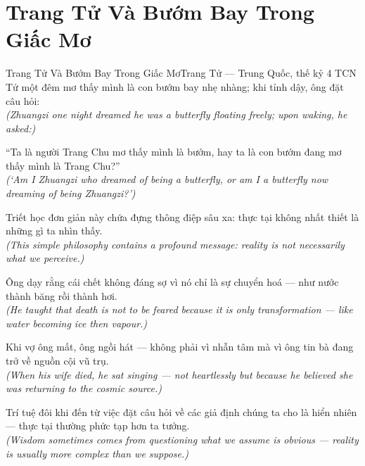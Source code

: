 \section{Trang Tử Và Bướm Bay Trong Giấc Mơ}
\begin{truyen}{Trang Tử Và Bướm Bay Trong Giấc Mơ}{Trang Tử --- Trung Quốc, thế kỷ 4 TCN}
 Tử một đêm mơ thấy mình là con bướm bay nhẹ nhàng; khi tỉnh dậy, ông đặt câu hỏi:\\[4pt]
\textit{(Zhuangzi one night dreamed he was a butterfly floating freely; upon waking, he asked:)}

``Ta là người Trang Chu mơ thấy mình là bướm, hay ta là con bướm đang mơ thấy mình là Trang Chu?''\\[4pt]
\textit{(`Am I Zhuangzi who dreamed of being a butterfly, or am I a butterfly now dreaming of being Zhuangzi?')}

Triết học đơn giản này chứa đựng thông điệp sâu xa: thực tại không nhất thiết là những gì ta nhìn thấy.\\[4pt]
\textit{(This simple philosophy contains a profound message: reality is not necessarily what we perceive.)}

Ông dạy rằng cái chết không đáng sợ vì nó chỉ là sự chuyển hoá --- như nước thành băng rồi thành hơi.\\[4pt]
\textit{(He taught that death is not to be feared because it is only transformation --- like water becoming ice then vapour.)}

Khi vợ ông mất, ông ngồi hát --- không phải vì nhẫn tâm mà vì ông tin bà đang trở về nguồn cội vũ trụ.\\[4pt]
\textit{(When his wife died, he sat singing --- not heartlessly but because he believed she was returning to the cosmic source.)}

\end{truyen}
\begin{baihoc}
  Trí tuệ đôi khi đến từ việc đặt câu hỏi về các giả định chúng ta cho là hiển nhiên --- thực tại thường phức tạp hơn ta tưởng.\\[4pt]
  \textit{(Wisdom sometimes comes from questioning what we assume is obvious --- reality is usually more complex than we suppose.)}
\end{baihoc}

